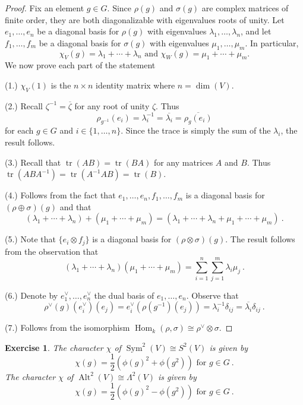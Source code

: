 \documentclass[12pt]{article}
\theoremstyle{plain}
\newtheorem{exercise}[theorem]{Exercise}
\theoremstyle{definition}
\theoremstyle{remark}
\numberwithin{equation}{section}
\begin{document}
\begin{proof}
Fix an element $g \in G$.
Since $\rho(g)$ and $\sigma(g)$ are complex matrices of finite order,
they are both diagonalizable with eigenvalues roots of unity.
Let $e_1,\ldots,e_n$ be a diagonal basis for $\rho(g)$
with eigenvalues $\lambda_1, \ldots, \lambda_n$, and
let $f_1, \ldots, f_m$ be a diagonal basis for $\sigma(g)$
with eigenvalues $\mu_1, \ldots, \mu_m$.
In particular,
\[
\chi_V(g) = \lambda_1 + \cdots + \lambda_n \textrm{ and }
\chi_W(g) = \mu_1 + \cdots + \mu_m.
\]
We now prove each part of the statement

(1.)
$\chi_V(1)$ is the $n \times n$ identity matrix where $n=\dim(V)$.


(2.)
Recall $\zeta^{-1}=\overline{\zeta}$ for any root of unity
$\zeta$.
Thus
\[
\rho_{g^{-1}}(e_i)=\lambda_i^{-1}=\overline{\lambda_i}=\overline{\rho_g(e_i)}
\]
for each $g \in G$ and $i \in \{1,\ldots,n\}$.
Since the trace is simply the sum of the $\lambda_i$, the result
follows.

(3.) Recall that $\operatorname{tr}(AB)=\operatorname{tr}(BA)$ for any
matrices $A$ and $B$.  Thus
$\operatorname{tr}(ABA^{-1})=\operatorname{tr}(A^{-1}AB)=\operatorname{tr}(B)$.



(4.) Follows from the fact that $e_1, \ldots, e_n, f_1, \ldots, f_m$ is a
diagonal basis for $(\rho \oplus \sigma)(g)$ and that
\[
(\lambda_1 + \cdots + \lambda_n) + (\mu_1 + \cdots + \mu_m) = 
(\lambda_1 + \cdots + \lambda_n + \mu_1 + \cdots + \mu_m) \ .
\]



(5.) Note that $\{ e_i \otimes f_j \}$ is a diagonal basis for
$(\rho \otimes \sigma)(g)$.  The result follows from the observation
that
\[
(\lambda_1 + \cdots + \lambda_n) (\mu_1 + \cdots + \mu_m)
= \sum_{i=1}^n \sum_{j=1}^m \lambda_i \mu_j \ .
\]



(6.) Denote by $e_1^\vee, \ldots, e_n^\vee$ the dual basis of $e_1,
\ldots, e_n$.
Observe that
\[
\rho^\vee(g)(e_i^\vee)(e_j)=e_i^\vee(\rho(g^{-1})(e_j))
= \lambda_i^{-1}\delta_{ij}=\overline{\lambda_i}\delta_{ij} \ .
\]



(7.) Follows from the isomorphism
$\operatorname{Hom}_k(\rho,\sigma) \cong \rho^\vee \otimes \sigma$.
\end{proof}


\begin{exercise}
The character $\chi$ of $\operatorname{Sym}^2(V) \cong S^2(V)$ is given by
\[
\chi(g) = \frac{1}{2}\left(\phi(g)^2 + \phi(g^2)\right)
\textrm{ for } g \in G \ .
\]
The character $\chi$ of $\operatorname{Alt}^2(V) \cong \Lambda^2(V)$ is given by
\[
\chi(g) = \frac{1}{2}\left(\phi(g)^2 - \phi(g^2)\right)
\textrm{ for } g \in G \ .
\]
\end{exercise}
\end{document}

